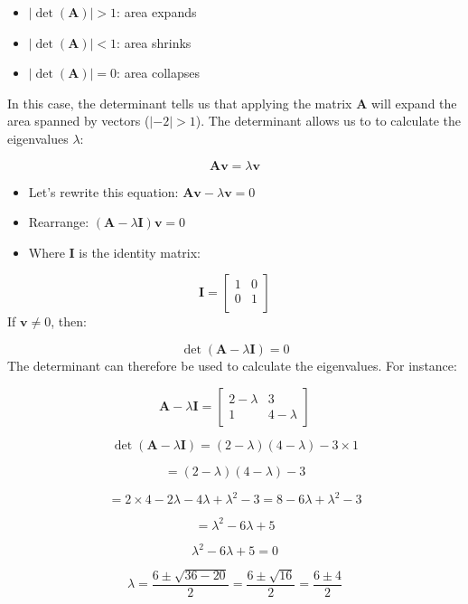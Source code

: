 \documentclass[
]{article}
\providecommand{\tightlist}{%
  \setlength{\itemsep}{0pt}\setlength{\parskip}{0pt}}
\begin{document}
\begin{itemize}
\tightlist
\item
  \(|\det({\mathbf{A}})|>1\): area expands
\item
  \(|\det({\mathbf{A}})|<1\): area shrinks
\item
  \(|\det({\mathbf{A}})|=0\): area collapses
\end{itemize}

In this case, the determinant tells us that applying the matrix
\(\mathbf{A}\) will expand the area spanned by vectors (\(|-2|>1\)). The
determinant allows us to to calculate the eigenvalues \(\lambda\):

\[
\mathbf{A} \mathbf{v} = \lambda \mathbf{v}
\]

\begin{itemize}
\tightlist
\item
  Let's rewrite this equation:
  \(\mathbf{A} \mathbf{v} - \lambda \mathbf{v} = 0\)
\item
  Rearrange: \((\mathbf{A} - \lambda \mathbf{I}) \mathbf{v} = 0\)
\item
  Where \(\mathbf{I}\) is the identity matrix:
\end{itemize}

\[
\mathbf{I} = 
\begin{bmatrix}
1 & 0 \\
0 & 1 \\
\end{bmatrix}
\] If \(\mathbf{v} \ne 0\), then:

\[
\det(\mathbf{A} - \lambda \mathbf{I}) = 0
\] The determinant can therefore be used to calculate the eigenvalues.
For instance:

\[
\mathbf{A} - \lambda \mathbf{I} = \begin{bmatrix} 2-\lambda & 3 \\ 1 & 4-\lambda \end{bmatrix}
\]

\[
\det(\mathbf{A} - \lambda \mathbf{I}) = (2-\lambda)(4-\lambda) - 3 \times 1
\]

\[
= (2-\lambda)(4-\lambda) - 3
\]

\[
= 2 \times 4 - 2\lambda - 4\lambda + \lambda^2 - 3 = 8 - 6\lambda + \lambda^2 - 3
\]

\[
= \lambda^2 - 6\lambda + 5
\]

\[
\lambda^2 - 6\lambda + 5 = 0
\]

\[
\lambda = \frac{6 \pm \sqrt{36 - 20}}{2} = \frac{6 \pm \sqrt{16}}{2} = \frac{6 \pm 4}{2}
\]
\end{document}
